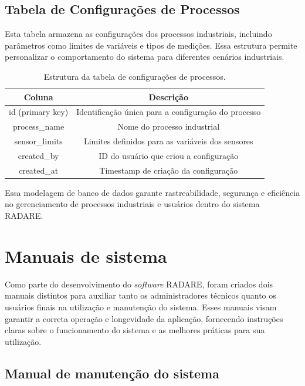 \subsection{Tabela de Configurações de Processos}

Esta tabela armazena as configurações dos processos industriais, incluindo parâmetros como limites de variáveis e tipos de medições. Essa estrutura permite personalizar o comportamento do sistema para diferentes cenários industriais.

\begin{table}[htbp]
    \centering
    \caption{Estrutura da tabela de configurações de processos.}
    \label{Tab:ProcessConfigurations}
    \begin{tabular}{|c|c|}
        \hline
        \textbf{Coluna} & \textbf{Descrição} \\ \hline
        id (primary key) & Identificação única para a configuração do processo \\ \hline
        process\_name & Nome do processo industrial \\ \hline
        sensor\_limits & Limites definidos para as variáveis dos sensores \\ \hline
        created\_by & ID do usuário que criou a configuração \\ \hline
        created\_at & Timestamp de criação da configuração \\ \hline
    \end{tabular}
\end{table}

Essa modelagem de banco de dados garante rastreabilidade, segurança e eficiência no gerenciamento de processos industriais e usuários dentro do sistema RADARE.

\section{Manuais de sistema}

Como parte do desenvolvimento do \textit{software} RADARE, foram criados dois manuais distintos para auxiliar tanto os administradores técnicos quanto os usuários finais na utilização e manutenção do sistema. Esses manuais visam garantir a correta operação e longevidade da aplicação, fornecendo instruções claras sobre o funcionamento do sistema e as melhores práticas para sua utilização.

\subsection{Manual de manutenção do sistema}

